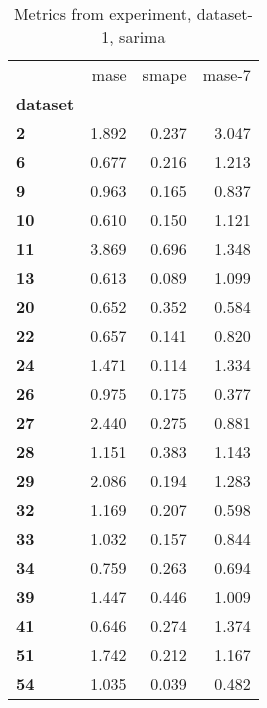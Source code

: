 \begin{table}[h]
\centering
\caption{Metrics from experiment, dataset-1, sarima}
\label{table:sarima-dataset-1}
\begin{tabular}{lrrr}
\toprule
{} &   mase &  smape &  mase-7 \\
\textbf{dataset} &        &        &         \\
\midrule
\textbf{2      } &  1.892 &  0.237 &   3.047 \\
\textbf{6      } &  0.677 &  0.216 &   1.213 \\
\textbf{9      } &  0.963 &  0.165 &   0.837 \\
\textbf{10     } &  0.610 &  0.150 &   1.121 \\
\textbf{11     } &  3.869 &  0.696 &   1.348 \\
\textbf{13     } &  0.613 &  0.089 &   1.099 \\
\textbf{20     } &  0.652 &  0.352 &   0.584 \\
\textbf{22     } &  0.657 &  0.141 &   0.820 \\
\textbf{24     } &  1.471 &  0.114 &   1.334 \\
\textbf{26     } &  0.975 &  0.175 &   0.377 \\
\textbf{27     } &  2.440 &  0.275 &   0.881 \\
\textbf{28     } &  1.151 &  0.383 &   1.143 \\
\textbf{29     } &  2.086 &  0.194 &   1.283 \\
\textbf{32     } &  1.169 &  0.207 &   0.598 \\
\textbf{33     } &  1.032 &  0.157 &   0.844 \\
\textbf{34     } &  0.759 &  0.263 &   0.694 \\
\textbf{39     } &  1.447 &  0.446 &   1.009 \\
\textbf{41     } &  0.646 &  0.274 &   1.374 \\
\textbf{51     } &  1.742 &  0.212 &   1.167 \\
\textbf{54     } &  1.035 &  0.039 &   0.482 \\
\bottomrule
\end{tabular}
\end{table}
